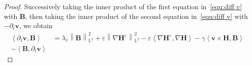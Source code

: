\documentclass[11pt, reqno]{amsart}
\theoremstyle{definition}
\theoremstyle{remark}
\numberwithin{equation}{section}
\newcommand{\bff}{\boldsymbol}
\newcommand{\bb}{\mathbb}
\newcommand{\ds}{\mathrm{d}s}
\newcommand{\norm}[2]{\left\|{#1}\right\|_{#2}}
\newcommand{\inpro}[2]{\left\langle#1,#2\right\rangle}
\newcommand{\abs}[1]{\left|{#1}\right|}
\begin{document}
\begin{proof}
Successively taking the inner product of the first equation in~\eqref{equ:diff v} with $\bff{B}$, then taking the inner product of the second equation in~\eqref{equ:diff v} with $-\partial_t \bff{v}$, we obtain
\begin{align*}
	\inpro{\partial_t \bff{v}}{\bff{B}}
	&=
	\lambda_r \norm{\bff{B}}{\bb{L}^2}^2
	+
	\varepsilon \norm{\nabla \bff{H}^\varepsilon}{\bb{L}^2}^2
	-
	\varepsilon \inpro{\nabla \bff{H}^\varepsilon}{\nabla \bff{H}}
	-
	\gamma \inpro{\bff{v}\times \bff{H}}{\bff{B}}
	\\
	-\inpro{\bff{B}}{\partial_t \bff{v}}

\end{align*}
\end{proof}
\end{document}
